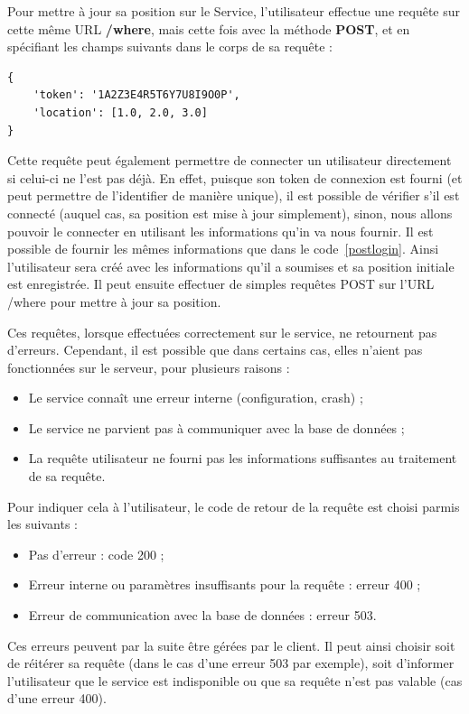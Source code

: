 Pour mettre à jour sa position sur le Service, l'utilisateur effectue une requête sur cette même URL \textbf{/where}, mais cette fois avec la méthode \textbf{POST}, et en spécifiant les champs suivants dans le corps de sa requête :
\lstset{language=Javascript}
\begin{lstlisting}[caption=Corps de la requête POST /where]
{
    'token': '1A2Z3E4R5T6Y7U8I9O0P',
    'location': [1.0, 2.0, 3.0]
}
\end{lstlisting}

Cette requête peut également permettre de connecter un utilisateur directement si celui-ci ne l'est pas déjà. En effet, puisque son token de connexion est fourni (et peut permettre de l'identifier de manière unique), il est possible de vérifier s'il est connecté (auquel cas, sa position est mise à jour simplement), sinon, nous allons pouvoir le connecter en utilisant les informations qu'in va nous fournir. Il est possible de fournir les mêmes informations que dans le code~\ref{postlogin}. Ainsi l'utilisateur sera créé avec les informations qu'il a soumises et sa position initiale est enregistrée. Il peut ensuite effectuer de simples requêtes POST sur l'URL /where pour mettre à jour sa position.

Ces requêtes, lorsque effectuées correctement sur le service, ne retournent pas d'erreurs. Cependant, il est possible que dans certains cas, elles n'aient pas fonctionnées sur le serveur, pour plusieurs raisons :
\begin{itemize}
    \item Le service connaît une erreur interne (configuration, crash) ;
    \item Le service ne parvient pas à communiquer avec la base de données ;
    \item La requête utilisateur ne fourni pas les informations suffisantes au traitement de sa requête.
\end{itemize}

Pour indiquer cela à l'utilisateur, le code de retour de la requête est choisi parmis les suivants :
\begin{itemize}
    \item Pas d'erreur : code 200 ;
    \item Erreur interne ou paramètres insuffisants pour la requête : erreur 400 ;
    \item Erreur de communication avec la base de données : erreur 503.
\end{itemize}

Ces erreurs peuvent par la suite être gérées par le client. Il peut ainsi choisir soit de réitérer sa requête (dans le cas d'une erreur 503 par exemple), soit d'informer l'utilisateur que le service est indisponible ou que sa requête n'est pas valable (cas d'une erreur 400).

